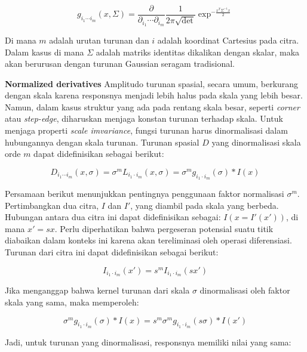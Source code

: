 \begin{equation*}
  g_{i_{1}\cdots i_{m}}(x,\Sigma) =\frac{\partial}{\partial_{i_{1}}\cdots \partial_{i_{m}}}\frac{1}{2\pi\sqrt{\det}}\exp^{-\frac{x^{T}\Sigma^{-1}x}{2}}
\end{equation*}

Di mana \(m\) adalah urutan turunan dan \(i\) adalah koordinat Cartesius pada citra. 
Dalam kasus di mana \(\Sigma\) adalah matriks identitas dikalikan dengan skalar, 
maka akan berurusan dengan turunan Gaussian seragam tradisional. 

\textbf{Normalized derivatives} Amplitudo turunan spasial, secara umum, berkurang dengan skala karena responsnya menjadi lebih halus pada skala yang lebih besar. 
Namun, dalam kasus struktur yang ada pada rentang skala besar, seperti \emph{corner} atau \emph{step-edge}, diharuskan menjaga konstan turunan terhadap skala. 
Untuk menjaga properti \emph{scale imvariance}, fungsi turunan harus dinormalisasi dalam hubungannya dengan skala turunan. 
Turunan spasial \(D\) yang dinormalisasi skala orde \(m\) dapat didefinisikan sebagai berikut:

\begin{equation*}
  D_{i_{1}\cdots i_{m}}(x,\sigma) = \sigma^{m}L_{i_{1} \cdot i_{m}}(x,\sigma) = \sigma^{m}g_{i_{1}\cdot i_{m}}(\sigma)*I(x)
\end{equation*}

Persamaan berikut menunjukkan pentingnya penggunaan faktor normalisasi \(\sigma^{m}\). 
Pertimbangkan dua citra, \(I\) dan \(I'\), yang diambil pada skala yang berbeda. 
Hubungan antara dua citra ini dapat didefinisikan sebagai: \(I(x = I'(x'))\), 
di mana \(x' = sx\). Perlu diperhatikan bahwa pergeseran potensial suatu titik diabaikan dalam konteks ini karena akan tereliminasi oleh operasi diferensiasi. 
Turunan dari citra ini dapat didefinisikan sebagai berikut:

\begin{equation*}
  I_{i_{1}\cdot i_{m}}(x') = s^{m}I_{i_{1}\cdot i_{m}}(sx')
\end{equation*}

Jika menganggap bahwa kernel turunan dari skala \(\sigma\) dinormalisasi oleh 
faktor skala yang sama, maka memperoleh:

\begin{equation*}
  \sigma^{m}g_{i_{1}\cdot i_{m}}(\sigma) * I(x)= s^{m}\sigma^{m}g_{i_{1}\cdot i_{m}}(s\sigma)*I(x')
\end{equation*}

Jadi, untuk turunan yang dinormalisasi, responsnya memiliki nilai yang sama:

